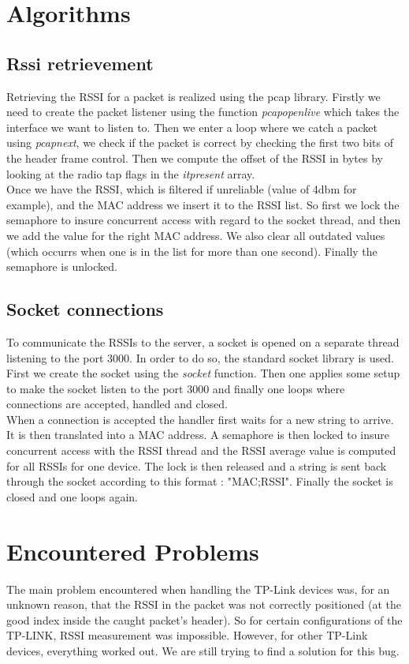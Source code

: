   \section{Algorithms}
   \subsection{Rssi retrievement}
    Retrieving the RSSI for a packet is realized using the pcap library. Firstly we need to create the packet listener using the function \textit{pcap\textunderscore open\textunderscore live} which takes the interface we want to listen to. Then we enter a loop where we catch a packet using \textit{pcap\textunderscore next}, we check if the packet is correct by checking the first two bits of the header frame control. Then we compute the offset of the RSSI in bytes by looking at the radio tap flags in the \textit{it\textunderscore present} array. \\
\indent Once we have the RSSI, which is filtered if unreliable (value of 4dbm for example), and the MAC address we insert it to the RSSI list. So first we lock the semaphore to insure concurrent access with regard to the socket thread, and then we add the value for the right MAC address. We also clear all outdated values (which occurrs when one is in the list for more than one second). Finally the semaphore is unlocked.

   \subsection{Socket connections}
    To communicate the RSSIs to the server, a socket is opened on a separate thread listening to the port 3000. In order to do so, the standard socket library is used. First we create the socket using the \textit{socket} function. Then one applies some setup to make the socket listen to the port 3000 and finally one loops where connections are accepted, handled and closed.\\
\indent When a connection is accepted the handler first waits for a new string to arrive. It is then translated into a MAC address. A semaphore is then locked to insure concurrent access with the RSSI thread and the RSSI average value is computed for all RSSIs for one device. The lock is then released and a string is sent back through the socket according to this format : "MAC;RSSI". Finally the socket is closed and one loops again.

  \section{Encountered Problems}
  The main problem encountered when handling the TP-Link devices was, for an unknown reason, that the RSSI in the packet was not correctly positioned (at the good index inside the caught packet's header). So for certain configurations of the TP-LINK, RSSI measurement was impossible. However, for other TP-Link devices, everything worked out. We are still trying to find a solution for this bug.